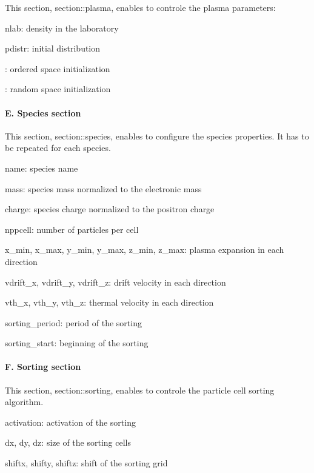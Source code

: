 This section, {\ttfamily section\+::plasma}, enables to controle the plasma parameters\+:


\begin{DoxyItemize}
\item {\ttfamily nlab}\+: density in the laboratory
\item {\ttfamily pdistr}\+: initial distribution
\begin{DoxyItemize}
\item {}\+: ordered space initialization
\item {}\+: random space initialization
\end{DoxyItemize}
\end{DoxyItemize}

\paragraph*{E. Species section}

This section, {\ttfamily section\+::species}, enables to configure the species properties. It has to be repeated for each species.


\begin{DoxyItemize}
\item {\ttfamily name}\+: species name
\item {\ttfamily mass}\+: species mass normalized to the electronic mass
\item {\ttfamily charge}\+: species charge normalized to the positron charge
\item {\ttfamily nppcell}\+: number of particles per cell
\item {\ttfamily x\+\_\+min}, {\ttfamily x\+\_\+max}, {\ttfamily y\+\_\+min}, {\ttfamily y\+\_\+max}, {\ttfamily z\+\_\+min}, {\ttfamily z\+\_\+max}\+: plasma expansion in each direction
\item {\ttfamily vdrift\+\_\+x}, {\ttfamily vdrift\+\_\+y}, {\ttfamily vdrift\+\_\+z}\+: drift velocity in each direction
\item {\ttfamily vth\+\_\+x}, {\ttfamily vth\+\_\+y}, {\ttfamily vth\+\_\+z}\+: thermal velocity in each direction
\item {\ttfamily sorting\+\_\+period}\+: period of the sorting
\item {\ttfamily sorting\+\_\+start}\+: beginning of the sorting
\end{DoxyItemize}

\paragraph*{F. Sorting section}

This section, {\ttfamily section\+::sorting}, enables to controle the particle cell sorting algorithm.


\begin{DoxyItemize}
\item {\ttfamily activation}\+: activation of the sorting
\item {\ttfamily dx}, {\ttfamily dy}, {\ttfamily dz}\+: size of the sorting cells
\item {\ttfamily shiftx}, {\ttfamily shifty}, {\ttfamily shiftz}\+: shift of the sorting grid 
\end{DoxyItemize}